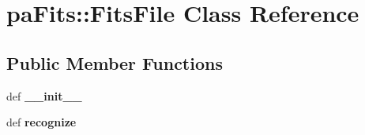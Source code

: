 \section{pa\-Fits::Fits\-File Class Reference}
\label{classpaFits_1_1FitsFile}
\subsection*{Public Member Functions}
\begin{CompactItemize}
\item 
def \textbf{\_\-\_\-init\_\-\_\-}\label{classpaFits_1_1FitsFile_2e8b3563f9cbef91512bebff08abe209}

\item 
def \textbf{recognize}\label{classpaFits_1_1FitsFile_33caf5b2099674c22e85626f725be294}

\end{CompactItemize}
